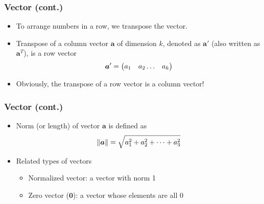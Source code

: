 \documentclass[pdflatex, 12pt]{beamer}
\begin{document}
\begin{frame}
\frametitle{Vector (cont.)}
\begin{itemize}
\item To arrange numbers in a row, we {\color{red} transpose} the vector.
\vspace{0.4cm}
\item Transpose of a column vector $\bm{a}$ of dimension $k$, denoted as $\bm{a}'$ (also written as $\bm{a}^T$), is a row vector
 \begin{equation}
 \bm{a}' = \begin{pmatrix}
 a_1 & a_2 \ldots & a_k \\
 \end{pmatrix} \notag
 \end{equation}
\item Obviously, the transpose of a row vector is a column vector!
\end{itemize}
\end{frame}

\begin{frame}
\frametitle{Vector (cont.)}
\begin{itemize}
\item {\color{red} Norm} (or length) of vector $\bm{a}$ is defined as 
 \begin{equation}
 \|\bm{a}\| = \sqrt{a_1^2 + a_2^2 + \cdots + a_3^2} \notag
 \end{equation}
\item Related types of vectors
 \begin{itemize}
 \item Normalized vector: a vector with norm 1
 \item Zero vector ($\bm{0}$): a vector whose elements are all 0
 \end{itemize}
\end{itemize}
\end{frame}
\end{document}
